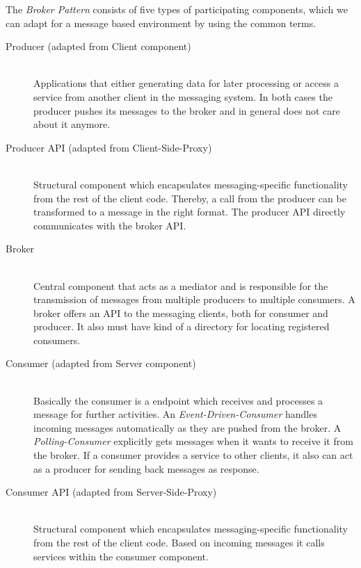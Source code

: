 The \textit{Broker Pattern} consists of five types of participating components,
which we can adapt for a message based environment by using the common terms.

\begin{description}
    \item[Producer (adapted from Client component)] \hfill \\
        {Applications that either generating data for later processing or
        access a service from another client in the messaging system. In both
        cases the producer pushes its messages to the broker and in general does
        not care about it anymore.}
    \item[Producer API (adapted from Client-Side-Proxy)] \hfill \\
        {Structural component which encapsulates messaging-specific
        functionality from the rest of the client code. Thereby, a call from the producer
        can be transformed to a message in the right format. The producer API
        directly communicates with the broker API.}
    \item[Broker] \hfill \\
        {Central component that acts as a mediator and is responsible for the
        transmission of messages from multiple producers to multiple consumers.
        A broker offers an API to the messaging clients, both for consumer and
        producer. It also must have kind of a directory for locating registered
        consumers.} 
    \item[Consumer (adapted from Server component)] \hfill \\
        {Basically the consumer is a endpoint which receives and processes a
            message for further activities. An \textit{Event-Driven-Consumer}
            handles incoming messages automatically as they are pushed from the
            broker. A \textit{Polling-Consumer} explicitly gets messages when it
            wants to receive it from the broker. If a consumer provides a
            service to other clients, it also can act as a producer for sending
            back messages as response.}
\item[Consumer API (adapted from Server-Side-Proxy)] \hfill \\
        {Structural component which encapsulates messaging-specific
        functionality from the rest of the client code. Based on incoming
        messages it calls services within the consumer component. }
\end{description}

